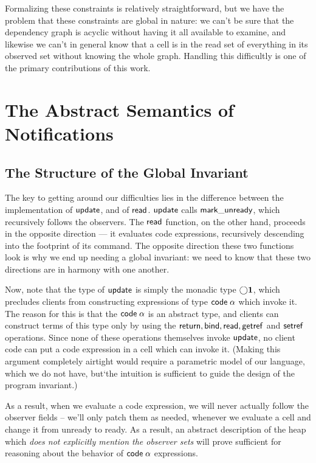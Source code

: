 Formalizing these constraints is relatively straightforward, but we
have the problem that these constraints are global in nature:
we can't be sure that the dependency graph is acyclic without having
it all available to examine, and likewise we can't in general know
that a cell is in the read set of everything in its observed set
without knowing the whole graph. Handling this difficultly is one of
the primary contributions of this work. 

\section{The Abstract Semantics of Notifications}

\subsection{The Structure of the Global Invariant}

The key to getting around our difficulties lies in the difference
between the implementation of $\mathsf{update}$, and of $\mathsf{read}$.
$\mathsf{update}$ calls $\mathsf{mark\_unready}$, which recursively follows
the observers. The $\mathsf{read}$ function, on the other hand,
proceeds in the opposite direction --- it evaluates code expressions,
recursively descending into the footprint of its command. The opposite
direction these two functions look is why we end up needing a global
invariant: we need to know that these two directions are in harmony
with one another.

Now, note that the type of $\mathsf{update}$ is simply the monadic type
$\bigcirc{\mathbf{1}}$, which precludes clients from constructing
expressions of type $\mathsf{code}\;{\alpha}$ which invoke it. The reason
for this is that the $\mathsf{code}\;{\alpha}$ is an abstract type, and
clients can construct terms of this type only by using the
$\mathsf{return}, \mathsf{bind}, \mathsf{read}, \mathsf{getref}$ and
$\mathsf{setref}$ operations. Since none of these operations themselves
invoke $\mathsf{update}$, no client code can put a code expression in a
cell which can invoke it. (Making this argument completely airtight
would require a parametric model of our language, which we do not
have, but`the intuition is sufficient to guide the design of the
program invariant.)

As a result, when we evaluate a code expression, we will never
actually follow the observer fields -- we'll only patch them as
needed, whenever we evaluate a cell and change it from unready to
ready.  As a result, an abstract description of the heap which
\emph{does not explicitly mention the observer sets} will prove
sufficient for reasoning about the behavior of $\mathsf{code}\;{\alpha}$
expressions.

